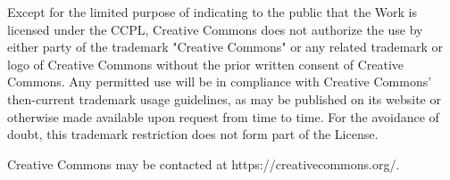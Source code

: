     Except for the limited purpose of indicating to the public that the
    Work is licensed under the CCPL, Creative Commons does not authorize
    the use by either party of the trademark "Creative Commons" or any
    related trademark or logo of Creative Commons without the prior
    written consent of Creative Commons. Any permitted use will be in
    compliance with Creative Commons' then-current trademark usage
    guidelines, as may be published on its website or otherwise made
    available upon request from time to time. For the avoidance of doubt,
    this trademark restriction does not form part of the License.

    Creative Commons may be contacted at https://creativecommons.org/.
